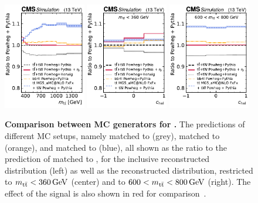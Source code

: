 \begin{figure}[!t]
    \centering
    \includegraphics[width=0.32\textwidth]{figures/ah/altbgs/generators_mtt_cms.pdf}
    \hfill
    \includegraphics[width=0.32\textwidth]{figures/ah/altbgs/generators_chel_lowmtt_cms.pdf}
    \hfill
    \includegraphics[width=0.32\textwidth]{figures/ah/altbgs/generators_chel_highmtt_cms.pdf}
    \caption{
        \textbf{Comparison between MC generators for \tttWsum.} The predictions of different MC setups, namely \powheg \tttWsum matched to \herwig (grey), \bbfourl matched to \pythia (orange), and \amcatnlo matched to \pythia (blue), all shown as the ratio to the prediction of \powheg \tttWsum matched to \pythia, for the inclusive reconstructed \mtt distribution (left) as well as the reconstructed \chel distribution, restricted to $\mtt < \SI{360}{\GeV}$ (center) and to $600 < \mtt < \SI{800}{\GeV}$ (right). The effect of the \etat signal is also shown in red for comparison~\cite{CMS:TOP-24-007}.
    }
    \label{fig:ah:herwigbb4l}
\end{figure}

